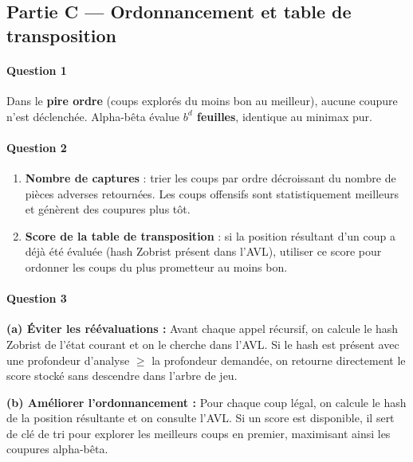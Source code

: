 \documentclass[a4paper,11pt]{article}
\newcommand{\boitereponse}[1]{%
  \begin{mdframed}[linecolor=black!40, backgroundcolor=white, linewidth=0.5pt,
                   innertopmargin=6pt, innerbottommargin=6pt]
  #1
  \end{mdframed}
}
\begin{document}
\subsection*{Partie C --- Ordonnancement et table de transposition}

\paragraph{Question 1}

\boitereponse{%
Dans le \textbf{pire ordre} (coups explorés du moins bon au meilleur), aucune coupure n'est déclenchée.
Alpha-bêta évalue \textbf{$b^d$ feuilles}, identique au minimax pur.%
}

\paragraph{Question 2}

\begin{enumerate}
  \item \textbf{Nombre de captures} : trier les coups par ordre décroissant du nombre de pièces adverses retournées. Les coups offensifs sont statistiquement meilleurs et génèrent des coupures plus tôt.
  \item \textbf{Score de la table de transposition} : si la position résultant d'un coup a déjà été évaluée (hash Zobrist présent dans l'AVL), utiliser ce score pour ordonner les coups du plus prometteur au moins bon.
\end{enumerate}

\paragraph{Question 3}

\textbf{(a) Éviter les réévaluations :}
Avant chaque appel récursif, on calcule le hash Zobrist de l'état courant et on le cherche dans l'AVL.
Si le hash est présent avec une profondeur d'analyse $\geq$ la profondeur demandée, on retourne directement le score stocké sans descendre dans l'arbre de jeu.

\textbf{(b) Améliorer l'ordonnancement :}
Pour chaque coup légal, on calcule le hash de la position résultante et on consulte l'AVL.
Si un score est disponible, il sert de clé de tri pour explorer les meilleurs coups en premier, maximisant ainsi les coupures alpha-bêta.
\end{document}
